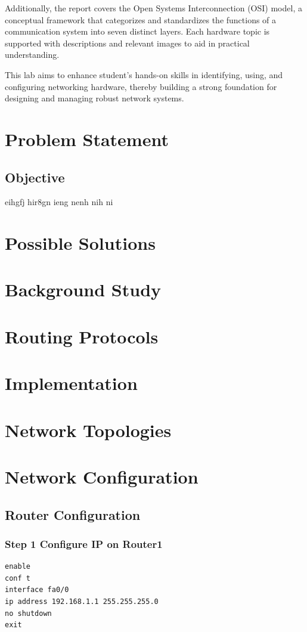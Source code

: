 \documentclass[12pt]{report}
\begin{document}
Additionally, the report covers the Open Systems Interconnection (OSI) model, a conceptual framework that categorizes and standardizes the functions of a communication system into seven distinct layers. Each hardware topic is supported with descriptions and relevant images to aid in practical understanding.

This lab aims to enhance student's hands-on skills in identifying, using, and configuring networking hardware, thereby building a strong foundation for designing and managing robust network systems.

\newpage

\chapter{Problem Statement}
\section{Objective}
\newpage
eihgfj hir8gn ieng nenh nih ni


\chapter{Possible Solutions}
\newpage

\chapter{Background Study}
\chapter{Routing Protocols}
\chapter{Implementation}
\chapter{Network Topologies}

\chapter{Network Configuration}
\section{Router Configuration}
\subsection*{Step 1 Configure IP on Router1}
\begin{Verbatim}[fontsize=\small, formatcom=\hackfont\color{black}, frame=single]
enable
conf t
interface fa0/0
ip address 192.168.1.1 255.255.255.0
no shutdown
exit
\end{Verbatim}
\end{document}
